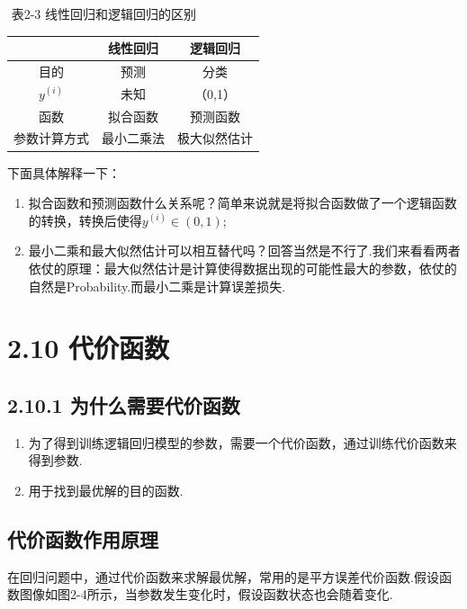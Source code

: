 ​ 表2-3 线性回归和逻辑回归的区别

\begin{longtable}[]{ccc}
\toprule
& 线性回归 & 逻辑回归\tabularnewline
\midrule
\endhead
目的 & 预测 & 分类\tabularnewline
$y^{(i)}$ & 未知 & （0,1）\tabularnewline
函数 & 拟合函数 & 预测函数\tabularnewline
参数计算方式 & 最小二乘法 & 极大似然估计\tabularnewline
 \bottomrule
\end{longtable}

下面具体解释一下：

\begin{enumerate}
\def\labelenumi{\arabic{enumi}.}
\item
  拟合函数和预测函数什么关系呢？简单来说就是将拟合函数做了一个逻辑函数的转换，转换后使得$y^{(i)} \in (0,1)$;
\item
  最小二乘和最大似然估计可以相互替代吗？回答当然是不行了.我们来看看两者依仗的原理：最大似然估计是计算使得数据出现的可能性最大的参数，依仗的自然是Probability.而最小二乘是计算误差损失.
\end{enumerate}

\section{2.10 代价函数}\label{ux4ee3ux4ef7ux51fdux6570}

\subsection{2.10.1
为什么需要代价函数}\label{ux4e3aux4ec0ux4e48ux9700ux8981ux4ee3ux4ef7ux51fdux6570}

\begin{enumerate}
\def\labelenumi{\arabic{enumi}.}
\item
  为了得到训练逻辑回归模型的参数，需要一个代价函数，通过训练代价函数来得到参数.
\item
  用于找到最优解的目的函数.
\end{enumerate}

\subsection{代价函数作用原理}\label{ux4ee3ux4ef7ux51fdux6570ux4f5cux7528ux539fux7406}

​
在回归问题中，通过代价函数来求解最优解，常用的是平方误差代价函数.假设函数图像如图2-4所示，当参数发生变化时，假设函数状态也会随着变化.

